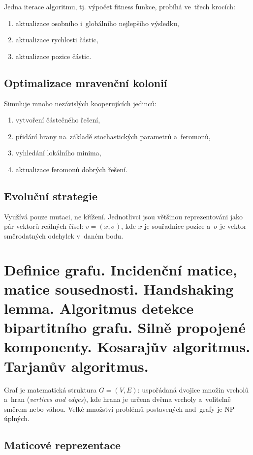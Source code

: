 Jedna iterace algoritmu, tj. výpočet fitness funkce, probíhá ve~třech krocích:

\begin{enumerate}
\item aktualizace osobního i~globálního nejlepšího výsledku,
\item aktualizace rychlosti částic,
\item aktualizace pozice částic.
\end{enumerate}

\subsection{Optimalizace mravenční kolonií}

Simuluje mnoho nezávislých kooperujících jedinců:

\begin{enumerate}
\item vytvoření částečného řešení,
\item přidání hrany na~základě stochastických parametrů a~feromonů,
\item vyhledání lokálního minima,
\item aktualizace feromonů dobrých řešení.
\end{enumerate}

\subsection{Evoluční strategie}

Využívá pouze mutaci, ne křížení.
Jednotlivci jsou většinou reprezentováni jako pár vektorů reálných čísel: $v = (x, \sigma)$, kde $x$ je souřadnice pozice a~$\sigma$ je vektor směrodatných odchylek v~daném bodu.

\clearpage
\section{Definice grafu. Incidenční matice, matice sousednosti. Handshaking lemma. Algoritmus detekce bipartitního grafu. Silně propojené komponenty. Kosarajův algoritmus. Tarjanův algoritmus.}

Graf je matematická struktura $G = (V, E)$: uspořádaná dvojice množin vrcholů a~hran (\emph{vertices and edges}), kde hrana je určena dvěma vrcholy a~volitelně směrem nebo váhou.
Velké množství problémů postavených nad~grafy je NP-úplných.

\subsection{Maticové reprezentace}

